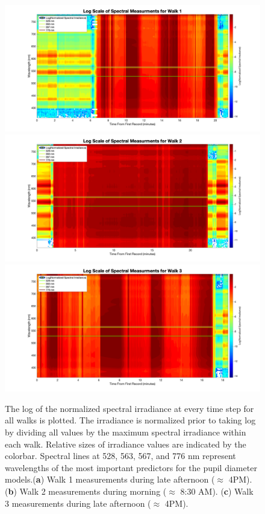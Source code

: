\documentclass[10pt]{article}
\begin{document}
 \begin{figure}[!p]
    \includegraphics[width=\textwidth,keepaspectratio]{./spectrum/spectrum3_2logRun1.png}
    \includegraphics[width=\textwidth,keepaspectratio]{./spectrum/spectrum3_2logRun2.png}
    \includegraphics[width=\textwidth,keepaspectratio]{./spectrum/spectrum3_2logRun3.png}
    
    \caption{The log of the normalized spectral irradiance at every time step for all walks is plotted. The irradiance is normalized prior to taking log by dividing all values by the maximum spectral irradiance within each walk. Relative sizes of irradiance values are indicated by the colorbar. Spectral lines at 528, 563, 567, and 776 nm represent wavelengths of the most important predictors for the pupil diameter models.(\textbf{a}) Walk 1 measurements during late afternoon ($\approx$ 4PM). (\textbf{b}) Walk 2 measurements during morning ($\approx$ 8:30 AM). (\textbf{c}) Walk 3 measurements during late afternoon ($\approx$ 4PM).}
    
    \label{fig:specLog}
\end{figure}
\end{document}
